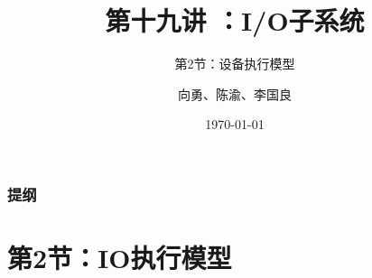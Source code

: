 


\title[第19讲]{第十九讲 ：I/O子系统} %
\subtitle{第2节：设备执行模型}
\author{向勇、陈渝、李国良} %
\date{\today} %



\begin{frame}
\titlepage %
\end{frame}

\begin{frame}
\frametitle{提纲} %
\tableofcontents %


\end{frame}
\section{第2节：IO执行模型} %
